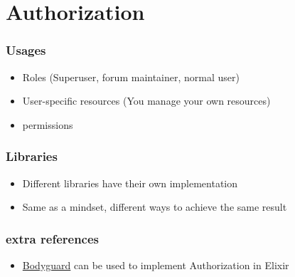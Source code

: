 \section{Authorization}

\frame{\tableofcontents[currentsection]}

\begin{frame}
    \frametitle{Usages}

    \begin{itemize}
        \item Roles (Superuser, forum maintainer, normal user)
        \item User-specific resources (You manage your own resources)
        \item permissions
    \end{itemize}
\end{frame}

\begin{frame}
    \frametitle{Libraries}

    \begin{itemize}
        \item Different libraries have their own implementation
        \item Same as a mindset, different ways to achieve the same result
    \end{itemize}
\end{frame}

\begin{frame}
    \frametitle{extra references}

    \begin{itemize}
        \item \href{https://github.com/schrockwell/bodyguard}{Bodyguard} can be used to implement Authorization in Elixir
    \end{itemize}
\end{frame}



